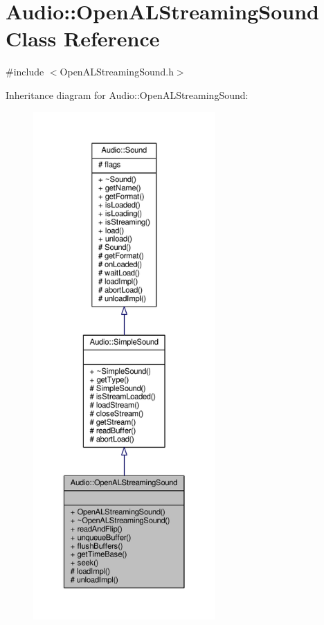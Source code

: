 \hypertarget{classAudio_1_1OpenALStreamingSound}{}\section{Audio\+:\+:Open\+A\+L\+Streaming\+Sound Class Reference}
\label{classAudio_1_1OpenALStreamingSound}


{\ttfamily \#include $<$Open\+A\+L\+Streaming\+Sound.\+h$>$}



Inheritance diagram for Audio\+:\+:Open\+A\+L\+Streaming\+Sound\+:
\nopagebreak
\begin{figure}[H]
\begin{center}
\leavevmode
\includegraphics[height=550pt]{d1/d36/classAudio_1_1OpenALStreamingSound__inherit__graph}
\end{center}
\end{figure}


